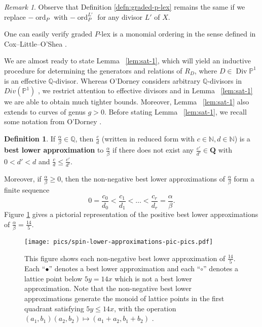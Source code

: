 \documentclass{amsart}
\theoremstyle{plain}
\theoremstyle{definition}
\newtheorem{defn}[thm]{Definition}
\theoremstyle{remark}
\newtheorem{rem}[thm]{Remark}
\numberwithin{equation}{section}
\newcommand\BN{{\mathbb N}}
\newcommand\BQ{{\mathbb Q}}
\newcommand\BP{{\mathbb P}}
\DeclareMathOperator{\ord}{ord}
\DeclareMathOperator\di{Div}
\newcommand{\halfcan}{L}
\begin{document}
\begin{rem}\label{rem:graded-P-lex-independent-of-line-bundle}
Observe that Definition \ref{defn:graded-p-lex} remains the same if we replace $-\ord_P$ with $-\ord_P^{L'}$ for any divisor $\halfcan'$ of $X$.
\end{rem}

\noindent One can easily verify graded $P$-lex is a monomial ordering in the sense defined in Cox--Little--O'Shea \cite[Chapter 2, $\mathsection$ 2, Definition 1]{cls:ideals-varieties-algorithms}.

We are almost ready to state Lemma ~\ref{lem:sat-1}, which will yield an inductive procedure for determining the generators and relations of $R_D$, where $D \in \di \BP^1$ is an effective $
\BQ$-divisor. Whereas O'Dorney considers arbitrary $\BQ$-divisors in $Div(\mathbb{P}^1)$ \cite[Theorem 8]{dorney:canonical}, we restrict attention to effective divisors and in Lemma ~\ref{lem:sat-1} we are able to obtain much tighter bounds.  Moreover, Lemma ~\ref{lem:sat-1} also extends to curves of genus $g > 0$. Before stating Lemma ~\ref{lem:sat-1}, we recall some notation from O'Dorney \cite{dorney:canonical}.

\begin{defn}\label{den:lower-approximation}
If $\frac{\alpha}{\beta}\in \BQ$, then $\frac{c}{d}$ (written in reduced form with $c \in \BN, d \in \BN$) is a {\bf{best lower approximation}} to $\frac{\alpha}{\beta}$ if there does not exist any $\frac{c'}{d'}\in \mathbf{Q}$ with $0<d'<d$ and $\frac{c}{d}\le \frac{c'}{d'}$. 
\end{defn}
Moreover, if $\frac{\alpha}{\beta}\ge 0$, then the non-negative best lower approximations of $\frac{\alpha}{\beta}$ form a finite sequence
\[
	0=\frac{c_0}{d_0} < \frac{c_1}{d_1} < \ldots < \frac{c_r}{d_r} = \frac{\alpha}{\beta}.
\]
Figure \ref{fig:s14/5-lattice} gives a pictorial representation of the positive best lower approximations of $\frac{\alpha}{\beta}=\frac{14}{5}$.

\begin{figure}
\texttt{[image: pics/spin-lower-approximations-pic-pics.pdf]}
\caption{This figure shows each non-negative best lower approximation of $\frac{14}{5}.$ Each ``$\bullet$'' denotes a best lower approximation and each ``$\circ$'' denotes a lattice point below $5y=14x$ which is not a best lower approximation.  Note that the non-negative best lower approximations generate the monoid of lattice points in the first quadrant satisfying  $5y \le 14x$, with the operation $(a_1, b_1)(a_2, b_2)\mapsto (a_1 + a_2, b_1 + b_2)$ .}\label{fig:s14/5-lattice}
\end{figure}
\end{document}
